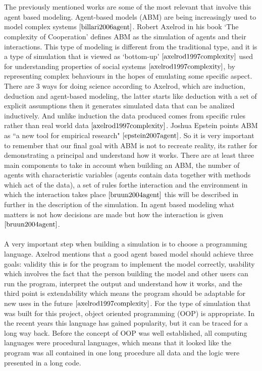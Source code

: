 \\\\The previously mentioned works are some of the most relevant that involve this agent based modeling. Agent-based models (ABM) are being increasingly used to model complex systems $\cite{billari2006agent}$. Robert Axelrod in his book `The complexity of Cooperation’ defines ABM as the simulation of agents and their interactions. This type of modeling is different from the traditional type, and it is a type of simulation that is viewed as `bottom-up’ $\cite{axelrod1997complexity}$ used for understanding properties of social systems $\cite{axelrod1997complexity}$, by representing complex behaviours in the hopes of emulating some specific aspect. There are 3 ways for doing science according to Axelrod, which are induction, deduction and agent-based modeling, the latter starts like deduction with a set of explicit assumptions then it generates simulated data that can be analized inductively. And unlike induction the data produced comes from specific rules rather than real world data $\cite{axelrod1997complexity}$. Joshua Epstein points ABM as ``a new tool for empirical research" $\cite{epstein2007agent}$. So it is very important to remember that our final goal with ABM is not to recreate reality, its rather for demonstrating a principal and understand how it works. 
There are at least three main components to take in account when building an ABM, the number of agents with characteristic variables (agents contain data together with methods which act of the data), a set of rules forthe interaction and the environment in which the interaction takes place $\cite{bruun2004agent}$ this will be described in further in the description of the simulation. In agent based modeling what matters is not how decisions are made but how the interaction is given $\cite{bruun2004agent}$. 
\\\\A very important step when building a simulation is to choose a programming language. Axelrod mentions that a good agent based model should achieve three goals: validity this is for the program to implement the model correctly, usability which involves the fact that the person building the model and other users can run the program, interpret the output and understand how it works, and the third point is extendability which means the program should be adaptable for new uses in the future $\cite{axelrod1997complexity}$. For the type of simulation that was built for this project, object oriented programming (OOP) is appropriate. In the recent years this language has gained popularity, but it can be traced for a long way back. Before the concept of OOP was well established, all computing languages were procedural languages, which means that it looked like the program was all contained in one long procedure all data and the logic were presented in a long code.

